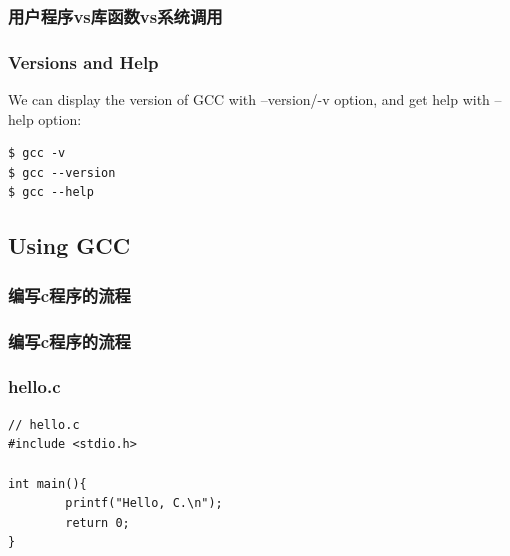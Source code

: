 \documentclass{beamer}
\begin{document}

\begin{frame}
\frametitle{用户程序vs库函数vs系统调用}

\begin{figure}
\end{figure}
\end{frame}
\begin{frame}[fragile]
\frametitle{Versions and Help}
We can display the version of GCC with --version/-v option, and get help with --help option:
\begin{example}
\begin{verbatim}
$ gcc -v
$ gcc --version
$ gcc --help
\end{verbatim}
\end{example}
\end{frame}

\subsection{Using GCC}
\begin{frame}
\frametitle{编写c程序的流程}
\begin{figure}
\end{figure}
\end{frame}
\begin{frame}
\frametitle{编写c程序的流程}
\begin{figure}
\end{figure}
\end{frame}

\begin{frame}[fragile]
\frametitle{hello.c}
\begin{example}
\begin{verbatim}
// hello.c
#include <stdio.h>

int main(){
        printf("Hello, C.\n");
        return 0;
}
\end{verbatim}
\end{example}
\end{frame}
\end{document}
